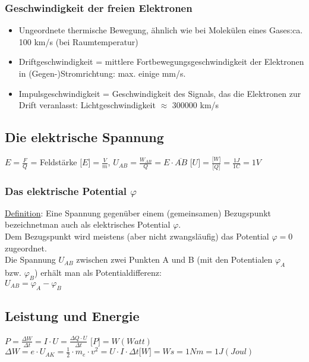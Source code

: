 \subsubsection{Geschwindigkeit der freien Elektronen}
\begin{itemize}
	\item Ungeordnete thermische Bewegung, ähnlich wie bei Molekülen eines Gases:ca. 100 km/s (bei Raumtemperatur)\\
	\item Driftgeschwindigkeit = mittlere Fortbewegungsgeschwindigkeit der Elektronen in  (Gegen-)Stromrichtung: max. einige mm/s.\\
	\item Impulsgeschwindigkeit = Geschwindigkeit des Signals, das die Elektronen zur Drift veranlasst: Lichtgeschwindigkeit $\approx$ 300000 km/s\\
\end{itemize}
\newpage
\subsection{Die elektrische Spannung}
\begin{multicols}{2}
	$ E = \frac{F}{Q}$ \hspace{5pt}= Feldstärke $ \lbrack E \rbrack = \frac{V}{m}$,\hspace{10pt} 
	$ U _{AB} = \frac{W _{AB}}{Q}= E \cdot \overline{AB}$ $ \lbrack U \rbrack = \frac{\lbrack W \rbrack}{\lbrack Q \rbrack} = \frac{1J}{1C}=1V$\\
\end{multicols}
\subsubsection{Das elektrische Potential $ \varphi $}
\underline{Definition}: Eine Spannung gegenüber einem (gemeinsamen) Bezugspunkt bezeichnetman auch als elektrisches Potential $\varphi$.\\
Dem Bezugspunkt wird meistens (aber nicht zwangsläufig) das Potential $\varphi = 0$ zugeordnet.\\
Die Spannung $U_{AB}$ zwischen zwei Punkten A und B (mit den Potentialen $\varphi _{A} $ bzw. $\varphi _{B}$) erhält man als Potentialdifferenz:\\ $ U_{AB}= \varphi _{A} - \varphi _{B}$\\

\subsection{Leistung und Energie}
$ P = \frac{\Delta W}{\Delta t}= I \cdot U = \frac{\Delta Q \cdot U}{\Delta t}$ \hspace{10pt} $\lbrack P \rbrack = W (Watt)$\\
$ \Delta W = e \cdot U_{AK} = \frac{1}{2} \cdot m_{e} \cdot v^2 = U \cdot I \cdot \Delta t$\hspace{10pt}$\lbrack W \rbrack = Ws = 1 Nm = 1J (Joul)$\\
